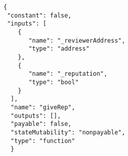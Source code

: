 \begin{lstlisting}[frame=single,caption=ABI fragment example,label=abi,captionpos=b]
 {
 "constant": false,
 "inputs": [ 
    { 
       "name": "_reviewerAddress",
       "type": "address"
    },
    { 
       "name": "_reputation", 
       "type": "bool" 
    } 
  ], 
  "name": "giveRep", 
  "outputs": [], 
  "payable": false, 
  "stateMutability": "nonpayable", 
  "type": "function" 
  } 
\end{lstlisting}
